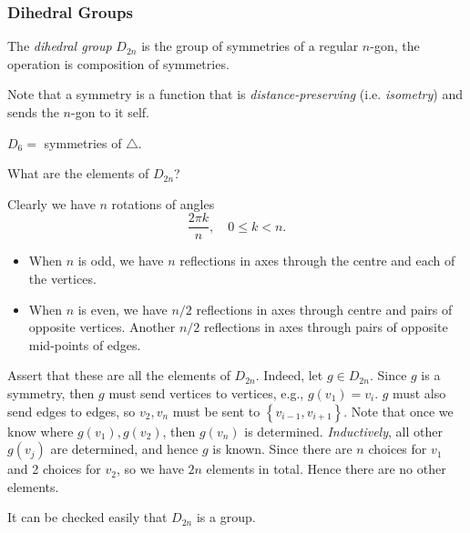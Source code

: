 \documentclass[a4paper]{article}
\begin{document}
\subsubsection{Dihedral Groups}
\begin{definition}
  The \textit{dihedral group} $ D_{2n} $ is the group of symmetries
  of a regular $n$-gon, the operation is composition of symmetries.
\end{definition}
\begin{remark}
  Note that a symmetry is a function that is
  \textit{distance-preserving} (i.e. \textit{isometry}) and sends the
  $n$-gon to it self.
\end{remark}
\begin{example}
  $ D_{6}= $ symmetries of $ \triangle $.
\end{example}
What are the elements of $ D_{2n} $?

Clearly we have $n$ rotations of angles
\[
  \frac{2\pi k}{n}, \quad 0\le k<n
.\]
\begin{itemize}
  \item When $n$ is odd, we have $n$ reflections in axes through the
    centre and each of the vertices.
  \item When $n$ is even, we have $ n/2 $ reflections in axes through
    centre and pairs of opposite vertices. Another $ n/2 $
    reflections in axes through pairs of opposite mid-points of edges.
\end{itemize}
Assert that these are all the elements of $ D_{2n} $. Indeed, let $
g\in D_{2n} $. Since $g$ is a symmetry, then $g$ must send vertices
to vertices, e.g., $ g(v_1)=v_i $. $g$ must also send edges to edges,
so $ v_2,v_n $ must be sent to $ \left\{ v_{i-1},v_{i+1}\right\} $.
Note that once we know where $g(v_1),g(v_2)$, then $g(v_n)$ is
determined. \textit{Inductively}, all other $g(v_j)$ are determined,
and hence $g$ is known. Since there are $ n $ choices for $v_1$ and 2
choices for $v_2$, so we have $2n$ elements in total. Hence there are
no other elements.

It can be checked easily that $D_{2n}$ is a group.
\end{document}
